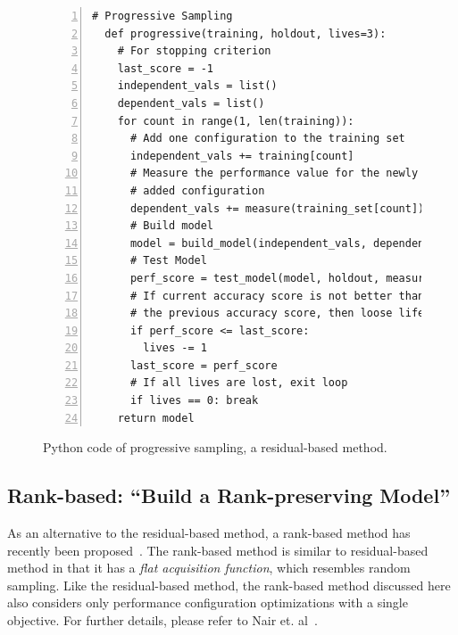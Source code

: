 \begin{figure}[t]
\small
\hspace{0.4cm}\begin{lstlisting}[xleftmargin=5.0ex,mathescape,frame=none,numbers=left]
  # Progressive Sampling
  def progressive(training, holdout, lives=3): 
    # For stopping criterion
    last_score = -1
    independent_vals = list()
    dependent_vals = list()
    for count in range(1, len(training)):    
      # Add one configuration to the training set
      independent_vals += training[count]      
      # Measure the performance value for the newly
      # added configuration 
      dependent_vals += measure(training_set[count])  
      # Build model
      model = build_model(independent_vals, dependent_vals)      
      # Test Model
      perf_score = test_model(model, holdout, measure(holdout))
      # If current accuracy score is not better than
      # the previous accuracy score, then loose life
      if perf_score <= last_score:
        lives -= 1
      last_score = perf_score
      # If all lives are lost, exit loop
      if lives == 0: break 
    return model
\end{lstlisting}
\caption{\small{Python code of progressive sampling, a residual-based method.}}
\label{fig:progressive_sampling}  
\end{figure}



\subsection{Rank-based: ``Build a Rank-preserving Model''}
As an alternative to the residual-based method, a rank-based method has recently been proposed~\cite{nair2017using}. 
The rank-based method is similar to residual-based method in that it has a \textit{flat acquisition function}, which resembles random sampling. Like the residual-based method, the rank-based method discussed here also considers only performance configuration optimizations with a single objective. For further details, please refer to Nair et. al~\cite{nair2017using}.

